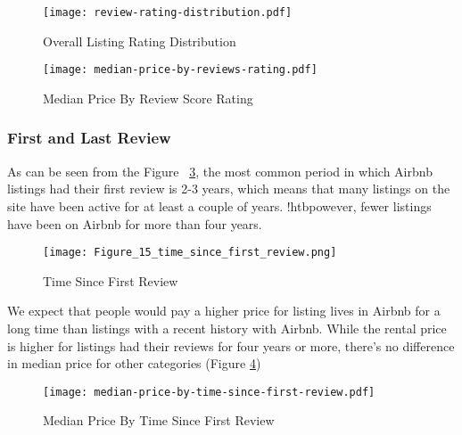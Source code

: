 \begin{figure}[!htbp]\centering
    \texttt{[image: review-rating-distribution.pdf]}
    \caption{Overall Listing Rating Distribution}
    \label{fig:overall-listing}
\end{figure}

\begin{figure}[!htbp]\centering
    \texttt{[image: median-price-by-reviews-rating.pdf]}
    \caption{Median Price By Review Score Rating}
    \label{fig:price_by_review_score_rating}
\end{figure}

\subsubsection*{First and Last Review}

As can be seen from the Figure ~\ref{fig:time_since_first_review}, the most
common period in which  Airbnb listings had their first review is 2-3 years,
which means that many listings on the site have been active for at least a
couple of years. !htbpowever,  fewer listings have been on Airbnb for more than four
years.

\begin{figure}[!htbp]\centering
    \texttt{[image: Figure\_15\_time\_since\_first\_review.png]}
    \caption{Time Since First Review}
    \label{fig:time_since_first_review}
\end{figure}

We expect that people would pay a higher price for listing lives in Airbnb for a
long time than listings with a recent history with Airbnb.
While the rental price is higher for listings had their reviews for four years
or more, there's no difference in median price for other categories
(Figure \ref{fig:time_since_first_review_price})

\begin{figure}[!htbp]\centering
    \texttt{[image: median-price-by-time-since-first-review.pdf]}
    \caption{Median Price By Time Since First Review}
    \label{fig:time_since_first_review_price}
\end{figure}


